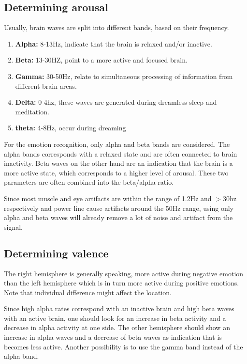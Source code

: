 \subsection{Determining arousal}
Usually, brain waves are split into different bands, based on their frequency\cite{EmotionRelativePower}\cite{WavesSite}.
\begin{enumerate}
\item \textbf{Alpha:} 8-13Hz, indicate that the brain is relaxed and/or inactive.
\item \textbf{Beta:} 13-30HZ, point to a more active and focused brain.
\item \textbf{Gamma:} 30-50Hz, relate to simultaneous processing of information from different brain areas.
\item \textbf{Delta:} 0-4hz, these waves are generated during dreamless sleep and meditation.
\item \textbf{theta:} 4-8Hz, occur during dreaming
\end{enumerate}
For the emotion recognition, only alpha and beta bands are considered. The alpha bands corresponds with a relaxed state and are often connected to brain inactivity\cite{ExtendedPaper}\cite{RealTimeEEGEmotion}. Beta waves on the other hand are an indication that the brain is a more active state, which corresponds to a higher level of arousal. These two parameters are often combined into the beta/alpha ratio.

\npar

Since most muscle and eye artifacts are within the range of 1.2Hz and $>$30hz respectively and power line cause artifacts around the 50Hz range, using only alpha and beta waves will already remove a lot of noise and artifact from the signal\cite{ExtendedPaper}.

\subsection{Determining valence}
The right hemisphere is generally speaking, more active during negative emotion than the left hemisphere which is in turn more active during positive emotions\cite{RealTimeEEGEmotion}\cite{EEGDatasets}. Note that individual difference might affect the location\cite{ExtendedPaper}.

\npar

Since high alpha rates correspond with an inactive brain and high beta waves with an active brain, one should look for an increase in beta activity and a decrease in alpha activity at one side. The other hemisphere should show an increase in alpha waves and a decrease of beta waves as indication that is becomes less active. Another possibility is to use the gamma band instead of the alpha band. 

